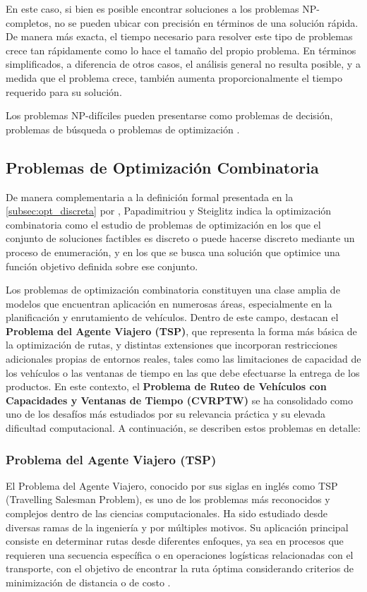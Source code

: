 \documentclass[12pt,titlepage,twoside,openright]{book}
\begin{document}
En este caso, si bien es posible encontrar soluciones a los problemas NP-completos, no se pueden ubicar con precisión en términos de una solución rápida. De manera más exacta, el tiempo necesario para resolver este tipo de problemas crece tan rápidamente como lo hace el tamaño del propio problema. En términos simplificados, a diferencia de otros casos, el análisis general no resulta posible, y a medida que el problema crece, también aumenta proporcionalmente el tiempo requerido para su solución.

Los problemas NP-difíciles pueden presentarse como problemas de decisión, problemas de búsqueda o problemas de optimización \citep{maldonado2013problema}.


\subsection{Problemas de Optimización Combinatoria}

De manera complementaria a la definición formal presentada en la \autoref{subsec:opt_discreta} por \citep{cobos2010}, Papadimitriou y Steiglitz \citep{papadimitriou1998} indica la optimización combinatoria como el estudio de problemas de optimización en los que el conjunto de soluciones factibles es discreto o puede hacerse discreto mediante un proceso de enumeración, y en los que se busca una solución que optimice una función objetivo definida sobre ese conjunto.

Los problemas de optimización combinatoria constituyen una clase amplia de modelos que encuentran aplicación en numerosas áreas, especialmente en la planificación y enrutamiento de vehículos. Dentro de este campo, destacan el \textbf{Problema del Agente Viajero (TSP)}, que representa la forma más básica de la optimización de rutas, y distintas extensiones que incorporan restricciones adicionales propias de entornos reales, tales como las limitaciones de capacidad de los vehículos o las ventanas de tiempo en las que debe efectuarse la entrega de los productos. En este contexto, el \textbf{Problema de Ruteo de Vehículos con Capacidades y Ventanas de Tiempo (CVRPTW)} se ha consolidado como uno de los desafíos más estudiados por su relevancia práctica y su elevada dificultad computacional. A continuación, se describen estos problemas en detalle:


\subsubsection{Problema del Agente Viajero (TSP)}
El Problema del Agente Viajero, conocido por sus siglas en inglés como TSP (Travelling Salesman Problem), es uno de los problemas más reconocidos y complejos dentro de las ciencias computacionales. Ha sido estudiado desde diversas ramas de la ingeniería y por múltiples motivos. Su aplicación principal consiste en determinar rutas desde diferentes enfoques, ya sea en procesos que requieren una secuencia específica o en operaciones logísticas relacionadas con el transporte, con el objetivo de encontrar la ruta óptima considerando criterios de minimización de distancia o de costo \citep{lopez2014tabu}.
\end{document}
